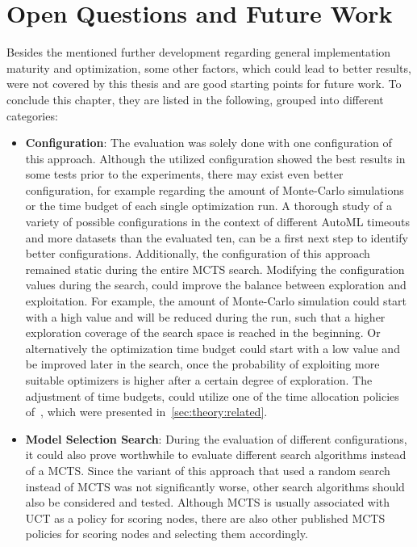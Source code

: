 \section{Open Questions and Future Work}
Besides the mentioned further development regarding general implementation maturity and optimization, some other factors, which could lead to better results, were not covered by this thesis and are good starting points for future work.
To conclude this chapter, they are listed in the following, grouped into different categories:
\begin{itemize}
    \item \textbf{Configuration}: The evaluation was solely done with one configuration of this approach.
    Although the utilized configuration showed the best results in some tests prior to the experiments, there may exist even better configuration, for example regarding the amount of Monte-Carlo simulations or the time budget of each single optimization run.
    A thorough study of a variety of possible configurations in the context of different AutoML timeouts and more datasets than the evaluated ten, can be a first next step to identify better configurations.\newline
    Additionally, the configuration of this approach remained static during the entire MCTS search.
    Modifying the configuration values during the search, could improve the balance between exploration and exploitation.
    For example, the amount of Monte-Carlo simulation could start with a high value and will be reduced during the run, such that a higher exploration coverage of the search space is reached in the beginning.
    Or alternatively the optimization time budget could start with a low value and be improved later in the search, once the probability of exploiting more suitable optimizers is higher after a certain degree of exploration.
    The adjustment of time budgets, could utilize one of the time allocation policies of~\textcite{Quemy-Two-Stage-Optimization}, which were presented in~\ref{sec:theory:related}.
    \item \textbf{Model Selection Search}: During the evaluation of different configurations, it could also prove worthwhile to evaluate different search algorithms instead of a MCTS.
    Since the variant of this approach that used a random search instead of MCTS was not significantly worse, other search algorithms should also be considered and tested.\newline
    Although MCTS is usually associated with UCT as a policy for scoring nodes, there are also other published MCTS policies for scoring nodes and selecting them accordingly.

\end{itemize}
